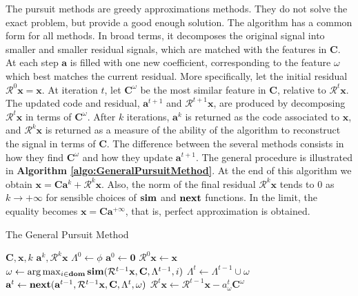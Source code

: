 \documentclass[12pt,a4paper,oneside,english]{UPBThesis}
\newcommand{\hcrange}[2]{\overline{{#1}\colon\!\!{#2}}}
\begin{document}
The pursuit methods are greedy approximations methods. They do not solve the exact problem, but provide a good enough solution. The algorithm has a common form for all methods. In broad terms, it decomposes the original signal into smaller and smaller residual signals, which are matched with the features in $\textbf{C}$. At each step $\textbf{a}$ is filled with one new coefficient, corresponding to the feature $\omega$ which best matches the current residual. More specifically, let the initial residual $\mathcal{R}^0\textbf{x} = \textbf{x}$. At iteration $t$, let $\textbf{C}^\omega$ be the most similar feature in $\textbf{C}$, relative to $\mathcal{R}^t\textbf{x}$. The updated code and residual, $\textbf{a}^{t+1}$ and $\mathcal{R}^{t+1}\textbf{x}$, are produced by decomposing $\mathcal{R}^t\textbf{x}$ in terms of $\textbf{C}^\omega$. After $k$ iterations, $\textbf{a}^k$ is returned as the code associated to $\textbf{x}$, and $\mathcal{R}^k\textbf{x}$ is returned as a measure of the ability of the algorithm to reconstruct the signal in terms of $\textbf{C}$. The difference between the several methods consists in how they find $\textbf{C}^\omega$ and how they update $\textbf{a}^{t+1}$. The general procedure is illustrated in \textbf{Algorithm \ref{algo:GeneralPursuitMethod}}. At the end of this algorithm we obtain $\textbf{x} = \textbf{C}\textbf{a}^k + \mathcal{R}^k\textbf{x}$. Also, the norm of the final residual $\mathcal{R}^k\textbf{x}$ tends to $0$ as $k \rightarrow +\infty$ for sensible choices of $\text{\textbf{sim}}$ and $\text{\textbf{next}}$ functions. In the limit, the equality becomes $\textbf{x} = \textbf{C}\textbf{a}^{+\infty}$, that is, perfect approximation is obtained.

\begin{algorithm}
\caption{The General Pursuit Method}
\label{algo:GeneralPursuitMethod}
\begin{algorithmic}
\Require $\textbf{C},\textbf{x},k$
\Ensure $\textbf{a}^k,\mathcal{R}^k\textbf{x}$
\State $\Lambda^0 \gets \phi$
\State $\textbf{a}^0 \gets \textbf{0}$
\State $\mathcal{R}^0\textbf{x} \gets \textbf{x}$
\For {$t = \hcrange{1}{k}$}
\State $\omega \gets \arg \max_{i \in \textbf{dom}} \text{\textbf{sim}}(\mathcal{R}^{t-1}\textbf{x},\textbf{C},\Lambda^{t-1},i)$
\State $\Lambda^t \gets \Lambda^{t-1} \cup \omega$
\State $\textbf{a}^t \gets \text{\textbf{next}}(\textbf{a}^{t-1},\mathcal{R}^{t-1}\textbf{x},\textbf{C},\Lambda^t,\omega)$
\State $\mathcal{R}^t\textbf{x} \gets \mathcal{R}^{t-1}\textbf{x} - a_\omega^t\textbf{C}^\omega$
\EndFor
\end{algorithmic}
\end{algorithm}
\end{document}
